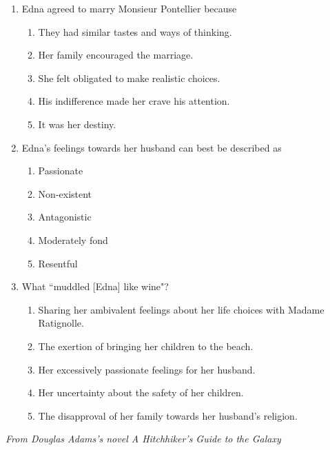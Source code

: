 \newpage
\begin{enumerate}
\item Edna agreed to marry Monsieur Pontellier because

\begin{enumerate}[label=(\Alph*)]
\item They had similar tastes and ways of thinking.
\item Her family encouraged the marriage.
\item She felt obligated to make realistic choices.
\item His indifference made her crave his attention.
\item It was her destiny.
\end{enumerate}

\bigskip
\item Edna's feelings towards her husband can best be described as

\begin{enumerate}[label=(\Alph*)]
\item Passionate
\item Non-existent
\item Antagonistic
\item Moderately fond
\item Resentful 
\end{enumerate}

\bigskip
\item What ``muddled [Edna] like wine"?

\begin{enumerate}[label=(\Alph*)]
\item Sharing her ambivalent feelings about her life choices with Madame Ratignolle.
\item The exertion of bringing her children to the beach.
\item Her excessively passionate feelings for her husband.
\item Her uncertainty about the safety of her children.
\item The disapproval of her family towards her husband's religion.
\end{enumerate}
\end{enumerate}

\newpage
\textit{From Douglas Adams's novel A Hitchhiker's Guide to the Galaxy}

